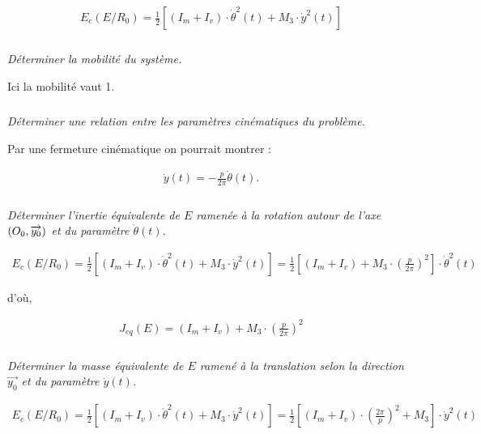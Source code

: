 \documentclass[10pt,fleqn]{article} %
\begin{document}
\begin{multicols}{2}
\begin{corrige}
\begin{itemize}
\begin{align*}
E_c(E/R_0)=\frac{1}{2}\left[\left(I_m+I_v\right)\cdot \dot{\theta}^2(t)+ M_3\cdot \dot{y}^2(t)\right]
\end{align*}
\end{itemize}
\end{corrige}\else\fi




\subparagraph{}\textit{Déterminer la mobilité du système.}
\ifprof\begin{corrige}
Ici la mobilité vaut 1.
\end{corrige}\else\fi

\subparagraph{}\textit{Déterminer une relation entre les paramètres cinématiques du problème.}

\ifprof\begin{corrige}
Par une fermeture cinématique on pourrait montrer : 

\begin{align*}
\dot{y}(t)=-\frac{p}{2\pi}\dot{\theta}(t).
\end{align*}
\end{corrige}\else\fi

\subparagraph{}\textit{Déterminer l'inertie équivalente de $E$ ramenée à la rotation autour de l'axe $\left(O_0,\overrightarrow{{y_0}}\right)$ et du paramètre $\dot{\theta}(t)$.}

\ifprof\begin{corrige}
\begin{align*}
E_c(E/R_0)=\frac{1}{2}\left[\left(I_m+I_v\right)\cdot \dot{\theta}^2(t)+ M_3\cdot \dot{y}^2(t)\right]
=\frac{1}{2}\left[\left(I_m+I_v\right)+ M_3\cdot \left(\frac{p}{2\pi}\right)^2\right]\cdot \dot{\theta}^2(t)
\end{align*}

d'où,

\begin{align*}
J_{eq}(E)=\left(I_m+I_v\right)+ M_3\cdot \left(\frac{p}{2\pi}\right)^2
\end{align*}
\end{corrige}\else\fi

\subparagraph{}\textit{Déterminer la masse équivalente de $E$ ramené à la translation selon la direction $\overrightarrow{y_0}$ et du paramètre $\dot{y}(t)$.}
\ifprof\begin{corrige}
\begin{align*}
E_c(E/R_0)=\frac{1}{2}\left[\left(I_m+I_v\right)\cdot \dot{\theta}^2(t)+ M_3\cdot \dot{y}^2(t)\right]
=\frac{1}{2}\left[\left(I_m+I_v\right)\cdot \left(\frac{2\pi}{p}\right)^2+ M_3\right]\cdot \dot{y}^2(t)
\end{align*}


\end{corrige}
\end{multicols}
\end{document}
